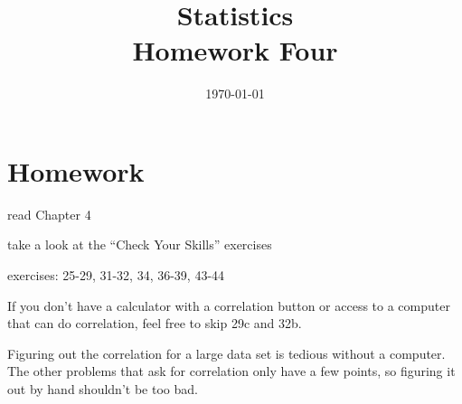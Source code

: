 \documentclass[letterpaper, landscape]{exam}
\title{Statistics \\ Homework Four}
\date{\today}
\author{}
\begin{document}
  \maketitle

  \section{Homework}
    \begin{itemize*}
      \item read Chapter 4 
      \item take a look at the ``Check Your Skills'' exercises
      \item exercises: 25-29, 31-32, 34, 36-39, 43-44
    \end{itemize*}

  \ifprintanswers
  \else

    If you don't have a calculator with a correlation button or access to a computer
    that can do correlation, feel free to skip 29c and 32b.  
    
    Figuring out the correlation for a large data set is tedious without a computer.
    The other problems that ask for correlation only have a few points, so figuring
    it out by hand shouldn't be too bad.

  \fi
\end{document}
